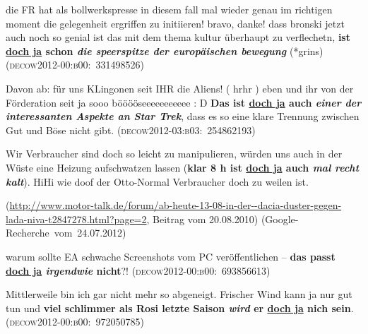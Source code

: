\begin{exe}
	\ex\label{470} 

	die FR hat als bollwerkspresse in diesem fall mal wieder genau im richtigen moment die gelegenheit ergriffen zu initiieren! bravo, danke! dass bronski 	jetzt auch noch so genial ist das mit dem thema kultur überhaupt zu verflechetn, \textbf{ist \underline{doch ja} schon \textit{die speerspitze der europäischen bewegung}} (*grins)\hfill\hbox{\scshape(decow2012-00:b00: 331498526)}		
\end{exe}

\begin{exe}
	\ex\label{471} 

	Davon ab: für uns KLingonen seit IHR die Aliens! ( hrhr ) eben und ihr von der Förderation seit ja sooo bööööseeeeeeeeeee : D \textbf{Das ist 				\underline{doch ja} auch \textit{einer der interessanten Aspekte an Star Trek}}, dass es so eine klare Trennung zwischen Gut und Böse nicht gibt.	\newline\hbox{}\hfill\hbox{\scshape(decow2012-03:b03: 254862193)}	
	\newline		
	\hbox{}\hfill\hbox{\citet[227]{Mueller2017b}}	
\end{exe}

\begin{exe}
	\ex\label{472} 

	Wir Verbraucher sind doch so leicht zu manipulieren, würden uns auch in der Wüste eine Heizung aufschwatzen lassen (\textbf{klar 8 h ist \underline{doch ja} auch \textit{mal recht kalt}}). HiHi wie doof der Otto-Normal Verbraucher doch zu weilen ist.		
	\begin{sloppypar}{\scriptsize(\url{http://www.motor-talk.de/forum/ab-heute-13-08-in-der--dacia-duster-gegen-lada-niva-t2847278.html?page=2}}, Beitrag vom 20.08.2010)
	\newline		
	\hbox{}\hfill\hbox{(Google-Recherche vom 24.07.2012)}\end{sloppypar}
\end{exe} 
							                    
\begin{exe}
	\ex\label{473} 
	warum sollte EA schwache Screenshots vom PC veröffentlichen – \textbf{das passt \underline{doch ja} \textit{irgendwie} nicht}?!
	\hbox{}\hfill\hbox{\scshape(decow2012-00:b00: 693856613)}
\end{exe} 
		               		 		        
\begin{exe}
	\ex\label{474} 
	Mittlerweile bin ich gar nicht mehr so abgeneigt. Frischer Wind kann ja nur gut tun und \textbf{viel schlimmer als Rosi letzte Saison \textit{wird} er \underline{doch ja} nich sein}.
	\hbox{}\hfill\hbox{\scshape(decow2012-00:b00: 972050785)}
\end{exe} 	
	
